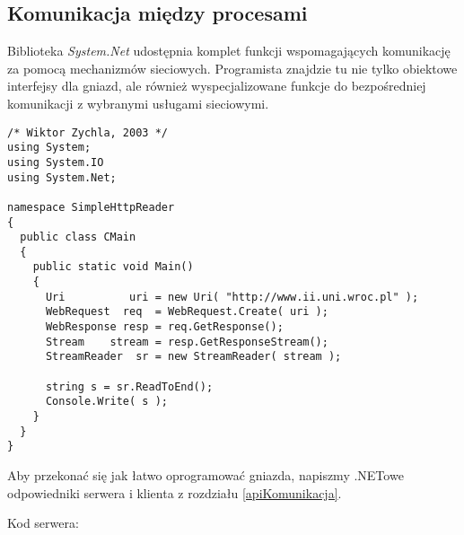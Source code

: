 ﻿\subsection{Komunikacja między procesami}

Biblioteka {\em System.Net} udostępnia komplet funkcji wspomagających komunikację za pomocą
mechanizmów sieciowych. Programista znajdzie tu nie tylko obiektowe interfejsy dla gniazd, ale również
wyspecjalizowane funkcje do bezpośredniej komunikacji z wybranymi usługami sieciowymi.

\begin{scriptsize}
\begin{verbatim}
/* Wiktor Zychla, 2003 */
using System;
using System.IO
using System.Net;

namespace SimpleHttpReader
{
  public class CMain
  {
    public static void Main()
    {
      Uri          uri = new Uri( "http://www.ii.uni.wroc.pl" );
      WebRequest  req  = WebRequest.Create( uri );
      WebResponse resp = req.GetResponse();
      Stream    stream = resp.GetResponseStream();
      StreamReader  sr = new StreamReader( stream );

      string s = sr.ReadToEnd();
      Console.Write( s );    
    }
  }
}
\end{verbatim}
\end{scriptsize}

Aby przekonać się jak łatwo oprogramować gniazda, napiszmy .NETowe odpowiedniki serwera i klienta z
rozdziału \ref{apiKomunikacja}.

Kod serwera:

